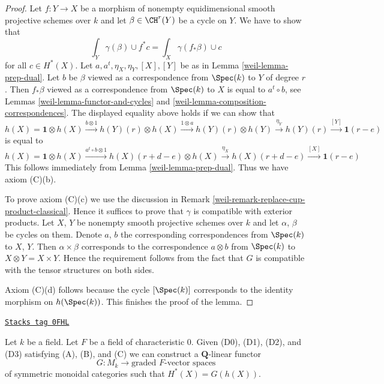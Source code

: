 \begin{proof}
\medskip\noindent
Let $f : Y \to X$ be a morphism of nonempty equidimensional
smooth projective schemes over $k$ and
let $\beta \in \CH^r(Y)$ be a cycle on $Y$. We have to show that
$$
\int_Y \gamma(\beta) \cup f^*c = \int_X \gamma(f_*\beta) \cup c
$$
for all $c \in H^*(X)$. Let $a, a^t, \eta_X, \eta_Y, [X], [Y]$
be as in Lemma \ref{weil-lemma-prep-dual}.
Let $b$ be $\beta$ viewed as a correspondence from $\Spec(k)$ to $Y$
of degree $r$. Then $f_*\beta$ viewed as a correspondence from
$\Spec(k)$ to $X$ is equal to $a^t \circ b$, see
Lemmas \ref{weil-lemma-functor-and-cycles} and
\ref{weil-lemma-composition-correspondences}.
The displayed equality above holds if we can show that
$$
h(X) = \mathbf{1} \otimes h(X)
\xrightarrow{b \otimes 1}
h(Y)(r) \otimes h(X)
\xrightarrow{1 \otimes a}
h(Y)(r) \otimes h(Y)
\xrightarrow{\eta_Y}
h(Y)(r)
\xrightarrow{[Y]}
\mathbf{1}(r - e)
$$
is equal to
$$
h(X) = \mathbf{1} \otimes h(X)
\xrightarrow{a^t \circ b \otimes 1}
h(X)(r + d - e) \otimes h(X)
\xrightarrow{\eta_X}
h(X)(r + d - e)
\xrightarrow{[X]}
\mathbf{1}(r - e)
$$
This follows immediately from Lemma \ref{weil-lemma-prep-dual}.
Thus we have axiom (C)(b).

\medskip\noindent
To prove axiom (C)(c) we use the discussion in
Remark \ref{weil-remark-replace-cup-product-classical}.
Hence it suffices to prove that $\gamma$ is compatible with
exterior products. Let $X$, $Y$ be nonempty smooth projective
schemes over $k$ and let $\alpha$, $\beta$ be cycles on them. Denote
$a$, $b$ the corresponding correspondences from $\Spec(k)$ to
$X$, $Y$. Then $\alpha \times \beta$ corresponds to the
correspondence $a \otimes b$ from $\Spec(k)$ to $X \otimes Y = X \times Y$.
Hence the requirement follows from the fact that $G$ is
compatible with the tensor structures on both sides.

\medskip\noindent
Axiom (C)(d) follows because the cycle $[\Spec(k)]$
corresponds to the identity morphism on $h(\Spec(k))$.
This finishes the proof of the lemma.
\end{proof}

\begin{lemma}
\label{weil-lemma-from-weil-to-functor}
\href{https://stacks.math.columbia.edu/tag/0FHL}{\texttt{Stacks tag 0FHL}}

Let $k$ be a field. Let $F$ be a field of characteristic $0$. Given
(D0), (D1), (D2), and (D3) satisfying (A), (B), and (C)
we can construct a $\mathbf{Q}$-linear functor
$$
G : M_k \longrightarrow \text{graded }F\text{-vector spaces}
$$
of symmetric monoidal categories such that $H^*(X) = G(h(X))$.
\end{lemma}

